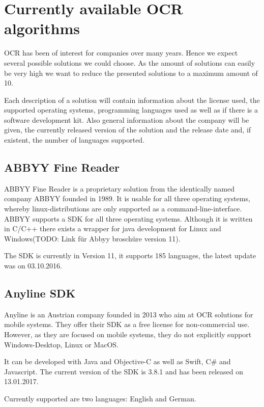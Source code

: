 \label{CurrAvailOCRAlgorithms}
\section{Currently available OCR algorithms}

OCR has been of interest for companies over many years. Hence we expect several possible solutions we could choose. As the amount of solutions can easily be very high we want to reduce the presented solutions to a maximum amount of 10.

Each description of a solution will contain information about the license used, the supported operating systems, programming languages used as well as if there is a software development kit. Also general information about the company will be given, the currently released version of the solution and the release date and, if existent, the number of languages supported.

\label{ABBYY}
\subsection{ABBYY Fine Reader}

ABBYY Fine Reader is a proprietary solution from the identically named company ABBYY founded in 1989. It is usable for all three operating systems, whereby linux-distributions are only supported as a command-line-interface. ABBYY supports a SDK for all three operating systems. Although it is written in C/C++ there exists a wrapper for java development for Linux and Windows(TODO: Link für Abbyy broschüre version 11). 

The SDK is currently in Version 11, it supports 185 languages, the latest update was on 03.10.2016.

\label{Anyline}
\subsection{Anyline SDK}

Anyline is an Austrian company founded in 2013 who aim at OCR solutions for mobile systems. They offer their SDK as a free license for non-commercial use. However, as they are focused on mobile systems, they do not explicitly support Windows-Desktop, Linux or MacOS.

It can be developed with Java and Objective-C as well as Swift, C\# and Javascript. The current version of the SDK is 3.8.1 and has been released on 13.01.2017.

Currently supported are two languages: English and German.

